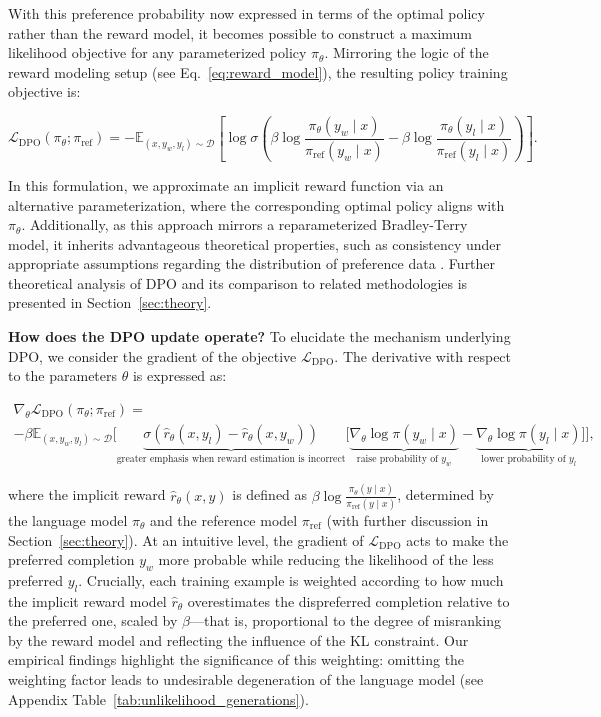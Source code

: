 With this preference probability now expressed in terms of the optimal policy rather than the reward model, it becomes possible to construct a maximum likelihood objective for any parameterized policy $\pi_\theta$. Mirroring the logic of the reward modeling setup (see Eq.~\ref{eq:reward_model}), the resulting policy training objective is:

\begin{equation}\label{eq:optimum_model}
    \mathcal{L}_\text{DPO}(\pi_{\theta}; \pi_\text{ref}) = -\mathbb{E}_{(x, y_w, y_l)\sim \mathcal{D}}\left[\log \sigma \left(\beta \log \frac{\pi_{\theta}(y_w\mid x)}{\pi_\text{ref}(y_w\mid x)} - \beta \log \frac{\pi_{\theta}(y_l\mid x)}{\pi_\text{ref}(y_l\mid x)}\right)\right].
\end{equation}

In this formulation, we approximate an implicit reward function via an alternative parameterization, where the corresponding optimal policy aligns with $\pi_\theta$. Additionally, as this approach mirrors a reparameterized Bradley-Terry model, it inherits advantageous theoretical properties, such as consistency under appropriate assumptions regarding the distribution of preference data \cite{bong2022generalized}. Further theoretical analysis of DPO and its comparison to related methodologies is presented in Section~\ref{sec:theory}.

\textbf{How does the DPO update operate?} To elucidate the mechanism underlying DPO, we consider the gradient of the objective $\mathcal{L}_\text{DPO}$. The derivative with respect to the parameters $\theta$ is expressed as:

\begin{multline*}\label{eq:gradient}
    \nabla_\theta \mathcal{L}_\text{DPO}(\pi_\theta;\pi_\text{ref}) = \\ -\beta\mathbb{E}_{(x, y_w, y_l) \sim \mathcal{D}} \Bigg[\underbrace{\sigma(\hat{r}_\theta(x, y_l) - \hat{r}_\theta (x, y_w))}_\text{greater emphasis when reward estimation is incorrect}\Big[\underbrace{\nabla_\theta\log \pi(y_w \mid x)}_\text{raise probability of $y_w$} - \underbrace{\nabla_\theta\log\pi(y_l \mid x)}_\text{lower probability of $y_l$}\Big]\Bigg],
\end{multline*}

where the implicit reward $\hat{r}_\theta(x, y)$ is defined as $\beta \log \frac{\pi_\theta(y \mid x)}{\pi_\text{ref}(y \mid x)}$, determined by the language model $\pi_\theta$ and the reference model $\pi_\text{ref}$ (with further discussion in Section~\ref{sec:theory}). At an intuitive level, the gradient of $\mathcal{L}_\text{DPO}$ acts to make the preferred completion $y_w$ more probable while reducing the likelihood of the less preferred $y_l$. Crucially, each training example is weighted according to how much the implicit reward model $\hat{r}_\theta$ overestimates the dispreferred completion relative to the preferred one, scaled by $\beta$—that is, proportional to the degree of misranking by the reward model and reflecting the influence of the KL constraint. Our empirical findings highlight the significance of this weighting: omitting the weighting factor leads to undesirable degeneration of the language model (see Appendix Table~\ref{tab:unlikelihood_generations}).

